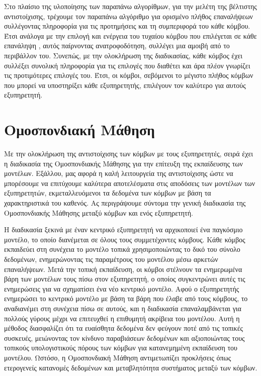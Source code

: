 Στο πλαίσιο της υλοποίησης των παραπάνω αλγορίθμων, για την μελέτη της βέλτιστης αντιστοίχισης, τρέχουμε τον παραπάνω αλγόριθμο για ορισμένο πλήθος επαναλήψεων συλλέγοντας πληροφορία για τις προτημήσεις και τη συμπεριφορά του κάθε κόμβου. Έτσι ανάλογα με την επιλογή και ενέργεια του τυχαίου κόμβου που επιλέγεται σε κάθε επανάληψη , αυτός παίρνοντας ανατροφοδότηση, συλλέγει μια αμοιβή από το περιβάλλον του. Συνεπώς, με την ολοκλήρωση της διαδικασίας, κάθε κόμβος έχει συλλέξει συνολική πληροφορία για τις επιλογές που διαθέτει και άρα πλέον γνωρίζει τις προτιμότερες επιλογές του. Έτσι, οι κόμβοι, σεβόμενοι το μέγιστο πλήθος κόμβων που μπορεί να υποστηρίξει κάθε εξυπηρετητής, επιλέγουν τον καλύτερο για αυτούς εξυπηρετητή.

\section{Ομοσπονδιακή Μάθηση}

Με την ολοκλήρωση της αντιστοίχισης των κόμβων με τους εξυπηρετητές, σειρά έχει η διαδικασία της Ομοσπονδιακής Μάθησης για την επίτευξη της εκπαίδευσης των μοντέλων. Εξάλλου, μας αφορά η καλή λειτουργεία της αντιστοίχισης ώστε να μπορέσουμε να επιτύχουμε καλύτερα αποτελέσματα στις αποδόσεις των μοντέλων των εξυπηρετητών, εκμεταλλευόμενοι τα δεδομένα των κόμβων με βάση τα χαρακτηριστικά του καθενός. Ας περιγράψουμε σύντομα την γενική διαδικασία της Ομοσπονδιακής Μάθησης μεταξύ κόμβων και ενός εξυπηρετητή. 

Η διαδικασία ξεκινά με έναν κεντρικό εξυπηρετητή να αρχικοποιεί ένα παγκόσμιο μοντέλο, το οποίο διανέμεται σε όλους τους συμμετέχοντες κόμβους. Κάθε κόμβος εκπαιδεύει στη συνέχεια το μοντέλο τοπικά χρησιμοποιώντας το δικό του σύνολο δεδομένων, ενημερώνοντας τις παραμέτρους του μοντέλου μέσω αρκετών επαναλήψεων. Μετά την τοπική εκπαίδευση, οι κόμβοι στέλνουν τα ενημερωμένα βάρη των μοντέλων τους πίσω στον εξυπηρετητή, ο οποίος συγκεντρώνει αυτές τις ενημερώσεις για να σχηματίσει ένα νέο κεντρικό μοντέλο. Αφού ο εξυπηρετητής ενημερώσει το κεντρικό μοντέλο με βάση τα βάρη που έλαβε από τους κόμβους, το αναδιανέμει στη συνέχεια πίσω σε αυτούς, και η διαδικασία επαναλαμβάνεται για πολλούς γύρους μέχρι να επιτευχθεί η επιθυμητή ακρίβεια του μοντέλου. Αυτή η μέθοδος διασφαλίζει ότι τα ευαίσθητα δεδομένα δεν φεύγουν ποτέ από τις τοπικές συσκευές, μειώνοντας τον κίνδυνο παραβιάσεων δεδομένων και αξιοποιώντας τους τοπικούς υπολογιστικούς πόρους των κόμβων για κατανεμημένη εκπαίδευση του μοντέλου. Ωστόσο, η Ομοσπονδιακή Μάθηση αντιμετωπίζει προκλήσεις όπως ετερογενείς κατανομές δεδομένων και μεταβλητότητα συστήματος μεταξύ των κόμβων.

